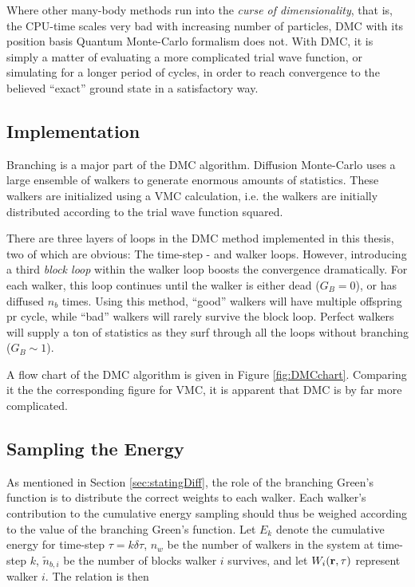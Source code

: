 Where other many-body methods run into the \textit{curse of dimensionality}, that is, the CPU-time scales very bad with increasing number of particles, DMC with its position basis Quantum Monte-Carlo formalism does not. With DMC, it is simply a matter of evaluating a more complicated trial wave function, or simulating for a longer period of cycles, in order to reach convergence to the believed ``exact'' ground state in a satisfactory way.

\subsection{Implementation}

Branching is a major part of the DMC algorithm. Diffusion Monte-Carlo uses a large ensemble of walkers to generate enormous amounts of statistics. These walkers are initialized using a VMC calculation, i.e. the walkers are initially distributed according to the trial wave function squared. 

There are three layers of loops in the DMC method implemented in this thesis, two of which are obvious: The time-step - and walker loops. However, introducing a third \textit{block loop} within the walker loop boosts the convergence dramatically. For each walker, this loop continues until the walker is either dead ($G_B = 0$), or has diffused $n_b$ times. Using this method, ``good'' walkers will have multiple offspring pr cycle, while ``bad'' walkers will rarely survive the block loop. Perfect walkers will supply a ton of statistics as they surf through all the loops without branching ($G_B \sim 1$).

A flow chart of the DMC algorithm is given in Figure \ref{fig:DMCchart}. Comparing it the the corresponding figure for VMC, it is apparent that DMC is by far more complicated. 

\subsection{Sampling the Energy}

As mentioned in Section \ref{sec:statingDiff}, the role of the branching Green's function is to distribute the correct weights to each walker. Each walker's contribution to the cumulative energy sampling should thus be weighed according to the value of the branching Green's function. Let $E_k$ denote the cumulative energy for time-step $\tau = k\delta\tau$, $n_w$ be the number of walkers in the system at time-step $k$, $\tilde n_{b,i}$ be the number of blocks walker $i$ survives, and let $W_i(\mathbf{r}, \tau)$ represent walker $i$. The relation is then

